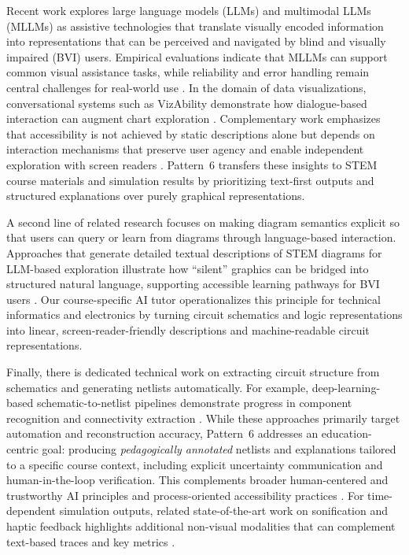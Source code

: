 Recent work explores large language models (LLMs) and multimodal LLMs (MLLMs) as assistive technologies that translate visually encoded information into representations that can be perceived and navigated by blind and visually impaired (BVI) users. Empirical evaluations indicate that MLLMs can support common visual assistance tasks, while reliability and error handling remain central challenges for real-world use \cite{Karamolegkou2025}. In the domain of data visualizations, conversational systems such as VizAbility demonstrate how dialogue-based interaction can augment chart exploration \cite{Gorniak2024VizAbility}. Complementary work emphasizes that accessibility is not achieved by static descriptions alone but depends on interaction mechanisms that preserve user agency and enable independent exploration with screen readers \cite{Sharif2025VoxEx}. Pattern~6 transfers these insights to STEM course materials and simulation results by prioritizing text-first outputs and structured explanations over purely graphical representations.

A second line of related research focuses on making diagram semantics explicit so that users can query or learn from diagrams through language-based interaction. Approaches that generate detailed textual descriptions of STEM diagrams for LLM-based exploration illustrate how ``silent'' graphics can be bridged into structured natural language, supporting accessible learning pathways for BVI users \cite{Wegwerth2023Diagram}. Our course-specific AI tutor operationalizes this principle for technical informatics and electronics by turning circuit schematics and logic representations into linear, screen-reader-friendly descriptions and machine-readable circuit representations.

Finally, there is dedicated technical work on extracting circuit structure from schematics and generating netlists automatically. For example, deep-learning-based schematic-to-netlist pipelines demonstrate progress in component recognition and connectivity extraction \cite{Hemker2024Schematics,Huang2025Netlistify}. While these approaches primarily target automation and reconstruction accuracy, Pattern~6 addresses an education-centric goal: producing \emph{pedagogically annotated} netlists and explanations tailored to a specific course context, including explicit uncertainty communication and human-in-the-loop verification. This complements broader human-centered and trustworthy AI principles \cite{shneiderman2020,ieee2019} and process-oriented accessibility practices \cite{lazar2015}. For time-dependent simulation outputs, related state-of-the-art work on sonification and haptic feedback highlights additional non-visual modalities that can complement text-based traces and key metrics \cite{Spagnuolo2025Sonification}.
